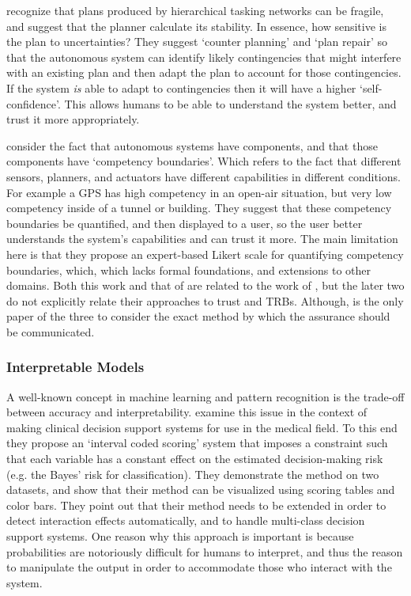     \citet{Kuter2015-qh} recognize that plans produced by hierarchical tasking networks can be fragile, and suggest that the planner calculate its stability. In essence, how sensitive is the plan to uncertainties? They suggest `counter planning' and `plan repair' so that the autonomous system can identify likely contingencies that might interfere with an existing plan and then adapt the plan to account for those contingencies. If the system \emph{is} able to adapt to contingencies then it will have a higher `self-confidence'. This allows humans to be able to understand the system better, and trust it more appropriately.

    \citet{Hutchins2015-if} consider the fact that autonomous systems have components, and that those components have `competency boundaries'. Which refers to the fact that different sensors, planners, and actuators have different capabilities in different conditions. For example a GPS has high competency in an open-air situation, but very low competency inside of a tunnel or building. They suggest that these competency boundaries be quantified, and then displayed to a user, so the user better understands the system's capabilities and can trust it more. The main limitation here is that they propose an expert-based Likert scale for quantifying competency boundaries, which, which  lacks formal foundations, and extensions to other domains. Both this work and that of \citeauthor{Kuter2015-qh} are related to the work of \citeauthor{Aitken2016-fb}, but the later two do not explicitly relate their approaches to trust and TRBs. Although, \citeauthor{Hutchins2015-if} is the only paper of the three to consider the exact method by which the assurance should be communicated.

\subsubsection{Interpretable Models} \label{sec:model_interp}
    A well-known concept in machine learning and pattern recognition is the trade-off between accuracy and interpretability. \citet{Van_Belle2012-dt} examine this issue in the context of making clinical decision support systems for use in the medical field. To this end they propose an `interval coded scoring' system that imposes a constraint such that each variable has a constant effect on the estimated decision-making risk (e.g. the Bayes' risk for classification).  They demonstrate the method on two datasets, and show that their method can be visualized using scoring tables and color bars. They point out that their method needs to be extended in order to detect interaction effects automatically, and to handle multi-class decision support systems. One reason why this approach is important is because probabilities are notoriously difficult for humans to interpret, and thus the reason to manipulate the output in order to accommodate those who interact with the system.

